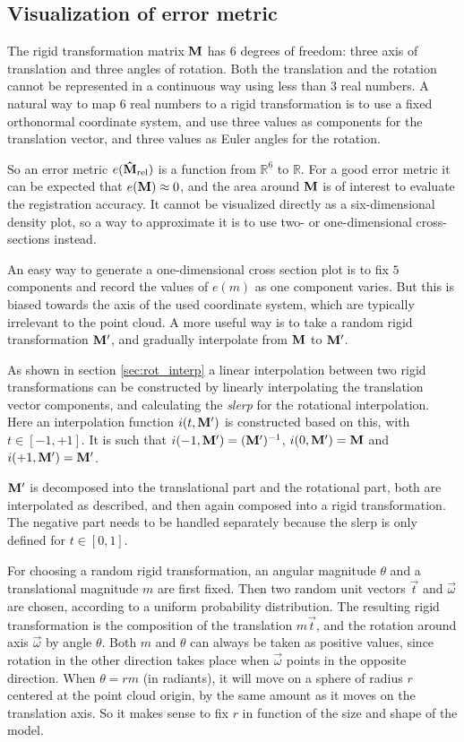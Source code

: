 \subsection{Visualization of error metric} \label{sec:err_vis}
The rigid transformation matrix $\mathbf{M}$ has $6$ degrees of freedom: three axis of translation and three angles of rotation. Both the translation and the rotation cannot be represented in a continuous way using less than $3$ real numbers. A natural way to map $6$ real numbers to a rigid transformation is to use a fixed orthonormal coordinate system, and use three values as components for the translation vector, and three values as Euler angles for the rotation.

So an error metric $e(\mathbf{\hat{M}}_{\text{rel}})$ is a function from $\mathbb{R}^6$ to $\mathbb{R}$. For a good error metric it can be expected that $e(\mathbf{M}) \approx 0$, and the area around $\mathbf{M}$ is of interest to evaluate the registration accuracy. It cannot be visualized directly as a six-dimensional density plot, so a way to approximate it is to use two- or one-dimensional cross-sections instead.

An easy way to generate a one-dimensional cross section plot is to fix $5$ components and record the values of $e(m)$ as one component varies. But this is biased towards the axis of the used coordinate system, which are typically irrelevant to the point cloud. A more useful way is to take a random rigid transformation $\mathbf{M'}$, and gradually interpolate from $\mathbf{M}$ to $\mathbf{M'}$.

As shown in section \ref{sec:rot_interp} a linear interpolation between two rigid transformations can be constructed by linearly interpolating the translation vector components, and calculating the \emph{slerp} for the rotational interpolation. Here an interpolation function $i(t, \mathbf{M'})$ is constructed based on this, with $t \in [-1, +1]$. It is such that $i(-1, \mathbf{M'}) = (\mathbf{M'})^{-1}$, $i(0, \mathbf{M'}) = \mathbf{M}$ and $i(+1, \mathbf{M'}) = \mathbf{M'}$.

$\mathbf{M'}$ is decomposed into the translational part and the rotational part, both are interpolated as described, and then again composed into a rigid transformation. The negative part needs to be handled separately because the slerp is only defined for $t \in [0, 1]$.

For choosing a random rigid transformation, an angular magnitude $\theta$ and a translational magnitude $m$ are first fixed. Then two random unit vectors $\vec{t}$ and $\vec{\omega}$ are chosen, according to a uniform probability distribution. The resulting rigid transformation is the composition of the translation $m \vec{t}$, and the rotation around axis $\vec{\omega}$ by angle $\theta$. Both $m$ and $\theta$ can always be taken as positive values, since rotation in the other direction takes place when $\vec{\omega}$ points in the opposite direction. When $\theta = r m$ (in radiants), it will move on a sphere of radius $r$ centered at the point cloud origin, by the same amount as it moves on the translation axis. So it makes sense to fix $r$ in function of the size and shape of the model.


